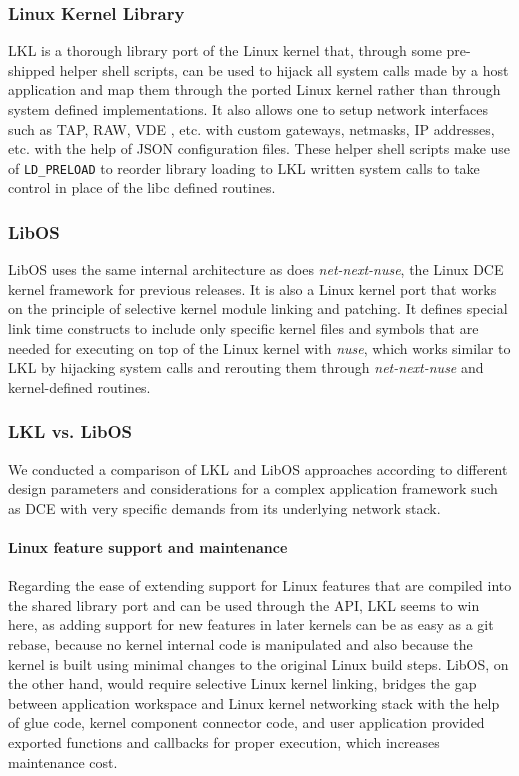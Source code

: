 \documentclass{sig-alternate}
\begin{document}
\subsubsection{Linux Kernel Library}
LKL is a thorough library port of the Linux kernel that, through some pre-shipped helper shell scripts, can be used to hijack
all system calls made by a host application and map them through the ported Linux kernel rather than through system defined implementations. It also allows one 
to setup network interfaces such as TAP, RAW, VDE , etc. with custom gateways, netmasks, IP addresses, etc. with the help of JSON configuration files. These helper
shell scripts make use of \texttt{LD\_PRELOAD} to reorder library loading to LKL written system calls to take control in place of the libc defined routines.
 
\subsubsection{LibOS}
LibOS uses the same internal architecture as does \textit{net-next-nuse},
the Linux DCE kernel framework for previous releases.
It is also a Linux kernel port that works on the principle of selective 
kernel module linking and patching. It defines special link time constructs
to include only specific kernel files and 
symbols that are needed for executing on top of the Linux kernel with \textit{nuse}, which works similar to LKL by hijacking system calls 
and rerouting them through \emph{net-next-nuse} and kernel-defined routines.

\subsubsection{LKL vs. LibOS}
We conducted a comparison of LKL and LibOS approaches according to different design parameters and considerations for a complex application framework such as
DCE with very specific demands from its underlying network stack.

\paragraph{Linux feature support and maintenance}
Regarding the ease of extending support for Linux features that are compiled into the shared library port and 
can be used through the API, LKL seems to win here, as adding support for new features in later kernels can be as easy as a git rebase, because no kernel internal code  
is manipulated and also because the kernel is built using minimal changes to the original Linux build steps. LibOS, on the other hand, would require selective Linux 
kernel linking, bridges the gap between application workspace and Linux kernel networking stack with the help of glue code, kernel component connector code, and user 
application provided exported functions and callbacks for proper execution, which increases maintenance cost.
\end{document}
